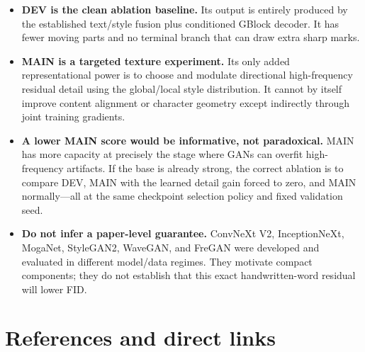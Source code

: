 \documentclass[10pt,a4paper]{article}
\begin{document}
\begin{itemize}[leftmargin=1.45em,itemsep=3pt]
  \item \textbf{DEV is the clean ablation baseline.}  Its output is entirely produced by the established text/style fusion plus conditioned GBlock decoder.  It has fewer moving parts and no terminal branch that can draw extra sharp marks.
  \item \textbf{MAIN is a targeted texture experiment.}  Its only added representational power is to choose and modulate directional high-frequency residual detail using the global/local style distribution.  It cannot by itself improve content alignment or character geometry except indirectly through joint training gradients.
  \item \textbf{A lower MAIN score would be informative, not paradoxical.}  MAIN has more capacity at precisely the stage where GANs can overfit high-frequency artifacts.  If the base is already strong, the correct ablation is to compare DEV, MAIN with the learned detail gain forced to zero, and MAIN normally---all at the same checkpoint selection policy and fixed validation seed.
  \item \textbf{Do not infer a paper-level guarantee.}  ConvNeXt V2, InceptionNeXt, MogaNet, StyleGAN2, WaveGAN, and FreGAN were developed and evaluated in different model/data regimes.  They motivate compact components; they do not establish that this exact handwritten-word residual will lower FID.
\end{itemize}

\section{References and direct links}
\end{document}

